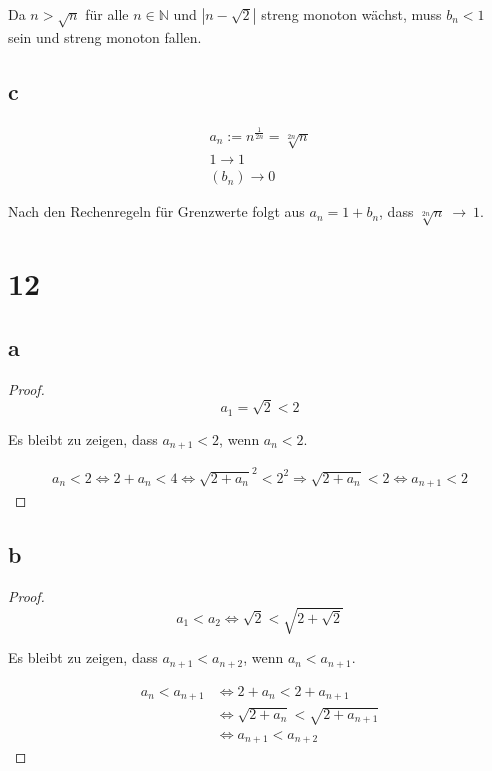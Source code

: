 \documentclass[a4paper,10pt]{article}
\begin{document}
Da $n > \sqrt{n}$ für alle $n \in \mathbb{N}$ und $|n - \sqrt{2}|$ streng monoton wächst, muss $b_n < 1$ sein und streng monoton fallen.

\subsection*{c}

\begin{align*}
 a_n := n^{\frac{1}{2n}} = \sqrt[2n]{n}\\
 1 \rightarrow 1\\
 (b_n) \rightarrow 0
\end{align*}
 
Nach den Rechenregeln für Grenzwerte folgt aus $a_n = 1 + b_n$, dass $\sqrt[2n]{n}~\rightarrow~1$.

\section*{12}

\subsection*{a}

\begin{proof}
 \begin{equation*}
  a_1 = \sqrt{2} < 2
 \end{equation*}

 Es bleibt zu zeigen, dass $a_{n + 1} < 2$, wenn $a_n < 2$.
 
 \begin{align*}
  a_n < 2 \Leftrightarrow 2 + a_n < 4 \Leftrightarrow \sqrt{2 + a_n}^2 < 2^2 \Rightarrow \sqrt{2 + a_n} < 2 \Leftrightarrow a_{n + 1} < 2
 \end{align*}
\end{proof}

\subsection*{b}

\begin{proof}
 \begin{equation*}
  a_1 < a_2 \Leftrightarrow \sqrt{2} < \sqrt{2 + \sqrt{2}}
 \end{equation*}

 Es bleibt zu zeigen, dass $a_{n + 1} < a_{n + 2}$, wenn $a_n < a_{n + 1}$.
 
 \begin{align*}
  a_n < a_{n + 1} & \Leftrightarrow 2 + a_n < 2 + a_{n + 1}\\
  & \Leftrightarrow \sqrt{2 + a_n} < \sqrt{2 + a_{n + 1}}\\
  & \Leftrightarrow a_{n + 1} < a_{n + 2}
 \end{align*}
\end{proof}
\end{document}
